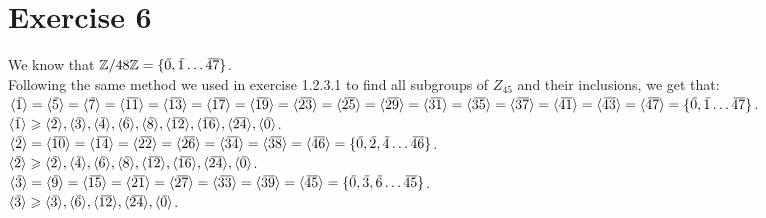 \documentclass[12pt]{article}
\begin{document}
    \section*{Exercise 6}
    We know that $\mathbb{Z}/48\mathbb{Z} = \{\,\overline{\!{0}}, \,\overline{\!{1}} \dots \,\overline{\!{47}}\}$. \\
    Following the same method we used in exercise 1.2.3.1
    to find all subgroups of $Z_{45}$ and their inclusions,
    we get that: \\
    $\langle \olsi{1} \rangle
    = \langle \olsi{5} \rangle = \langle \olsi{7} \rangle
    = \langle \olsi{11} \rangle = \langle \olsi{13} \rangle
    = \langle \olsi{17} \rangle = \langle \olsi{19} \rangle
    = \langle \olsi{23} \rangle = \langle \olsi{25} \rangle
    = \langle \olsi{29} \rangle = \langle \olsi{31} \rangle
    = \langle \olsi{35} \rangle = \langle \olsi{37} \rangle
    = \langle \olsi{41} \rangle = \langle \olsi{43} \rangle
    = \langle \olsi{47} \rangle
    = \{\olsi{0}, \olsi{1} \dots \olsi{47}\}$. \\
    $\langle \olsi{1} \rangle \geqslant
    \langle \olsi{2} \rangle,
    \langle \olsi{3} \rangle,
    \langle \olsi{4} \rangle,
    \langle \olsi{6} \rangle,
    \langle \olsi{8} \rangle,
    \langle \olsi{12} \rangle,
    \langle \olsi{16} \rangle,
    \langle \olsi{24} \rangle,
    \langle \olsi{0} \rangle$. \\
    $\langle \olsi{2} \rangle
    = \langle \olsi{10} \rangle = \langle \olsi{14} \rangle
    = \langle \olsi{22} \rangle = \langle \olsi{26} \rangle
    = \langle \olsi{34} \rangle = \langle \olsi{38} \rangle
    = \langle \olsi{46} \rangle 
    = \{\olsi{0}, \olsi{2}, \olsi{4} \dots \olsi{46}\}$. \\
    $\langle \olsi{2} \rangle \geqslant
    \langle \olsi{2} \rangle,
    \langle \olsi{4} \rangle,
    \langle \olsi{6} \rangle,
    \langle \olsi{8} \rangle,
    \langle \olsi{12} \rangle,
    \langle \olsi{16} \rangle,
    \langle \olsi{24} \rangle,
    \langle \olsi{0} \rangle$. \\
    $\langle \olsi{3} \rangle
    = \langle \olsi{9} \rangle = \langle \olsi{15} \rangle
    = \langle \olsi{21} \rangle = \langle \olsi{27} \rangle
    = \langle \olsi{33} \rangle = \langle \olsi{39} \rangle
    = \langle \olsi{45} \rangle 
    = \{\olsi{0}, \olsi{3}, \olsi{6} \dots \olsi{45}\}$. \\
    $\langle \,\overline{\!{3}} \rangle \geqslant
    \langle \,\overline{\!{3}} \rangle,
    \langle \,\overline{\!{6}} \rangle,
    \langle \,\overline{\!{12}} \rangle,
    \langle \,\overline{\!{24}} \rangle,
    \langle \,\overline{\!{0}} \rangle$. \\
\end{document}
